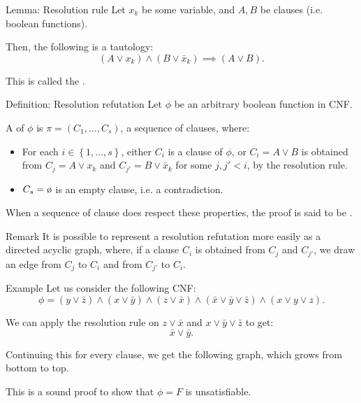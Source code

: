 \documentclass[a4paper]{article}
\begin{document}
\begin{parag}{Lemma: Resolution rule}
    Let $x_k$ be some variable, and $A, B$ be clauses (i.e. boolean functions).

    Then, the following is a tautology: 
    \[\left(A \lor x_k\right) \land \left(B \lor \bar{x}_k\right) \implies \left(A \lor B\right).\]

    This is called the .
\end{parag}

\begin{parag}{Definition: Resolution refutation}
    Let $\phi$ be an arbitrary boolean function in CNF.

    A  of $\phi$ is $\pi = \left(C_1, \ldots, C_s\right)$, a sequence of clauses, where:
    \begin{itemize}
        \item For each $i \in \left\{1, \ldots, s\right\}$, either $C_i$ is a clause of $\phi$, or $C_i = A \lor B$ is obtained from $C_j = A \lor x_k$ and $C_{j'} = B \lor \bar{x}_k$ for some $j, j' < i$, by the resolution rule.
        \item $C_s = \o$ is an empty clause, i.e. a contradiction.
    \end{itemize}

    When a sequence of clause does respect these properties, the proof is said to be .

    \begin{subparag}{Remark}
        It is possible to represent a resolution refutation more easily as a directed acyclic graph, where, if a clause $C_i$ is obtained from $C_j$ and $C_{j'}$, we draw an edge from $C_j$ to $C_i$ and from $C_{j'}$ to $C_i$.
    \end{subparag}
\end{parag}

\begin{parag}{Example}
    Let us consider the following CNF: 
    \[\phi = \left(y \lor \bar{z}\right) \land \left(x \lor \bar{y}\right) \land \left(z \lor \bar{x}\right) \land \left(\bar{x} \lor \bar{y} \lor \bar{z}\right) \land \left(x \lor y \lor z\right).\]

    We can apply the resolution rule on $z \lor \bar{x}$ and $x \lor \bar{y} \lor \bar{z}$ to get: 
    \[\bar{x} \lor \bar{y}.\]

    Continuing this for every clause, we get the following graph, which grows from bottom to top.

    This is a sound proof to show that $\phi = F$ is unsatisfiable.
\end{parag}
\end{document}
